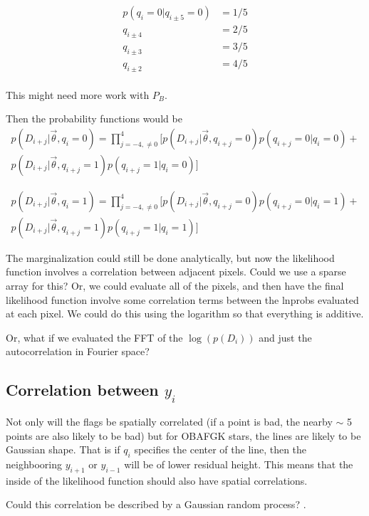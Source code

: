 \documentclass[preprint]{aastex} %
\newcommand{\vt}{\vec{\theta}}
\begin{document}
\begin{align}
 p(q_i = 0 | q_{i \pm 5} = 0) &= 1/5 \\
 q_{i \pm 4} &= 2/5 \\
 q_{i \pm 3} &= 3/5 \\
 q_{i \pm 2} &= 4/5 \\
\end{align} 

This might need more work with $P_B$.

Then the probability functions would be
\begin{multline}
  p(D_{i + j} | \vt, q_i =0) = \prod_{j = -4, \ne 0}^4 \bigl [ p(D_{i+j} | \vt, q_{i +j}=0) p(q_{i+j} = 0 | q_i=0) + \\
    p(D_{i + j} | \vt, q_{i + j} = 1) p(q_{i +j} = 1 | q_i = 0) \bigr ]
\end{multline}


\begin{multline}
  p(D_{i + j} | \vt, q_i = 1) = \prod_{j = -4, \ne 0}^4 \bigl [ p(D_{i+j} | \vt, q_{i +j}=0) p(q_{i+j} = 0 | q_i=1) + \\
    p(D_{i + j} | \vt, q_{i + j} = 1) p(q_{i +j} = 1 | q_i = 1) \bigr ]
\end{multline}

The marginalization could still be done analytically, but now the likelihood function involves a correlation between adjacent pixels. Could we use a sparse array for this? Or, we could evaluate all of the pixels, and then have the final likelihood function involve some correlation terms between the lnprobs evaluated at each pixel. We could do this using the logarithm so that everything is additive.

Or, what if we evaluated the FFT of the $\log(p(D_i))$ and just the autocorrelation in Fourier space?

\subsection{Correlation between $y_i$}
Not only will the flags be spatially correlated (if a point is bad, the nearby $\sim$ 5 points are also likely to be bad) but for OBAFGK stars, the lines are likely to be Gaussian shape. That is if $q_i$ specifies the center of the line, then the neighbooring $y_{i+1}$ or $y_{i-1}$ will be of lower residual height. This means that the inside of the likelihood function should also have spatial correlations.

Could this correlation be described by a Gaussian random process? \citep{rw05}.
\end{document}
